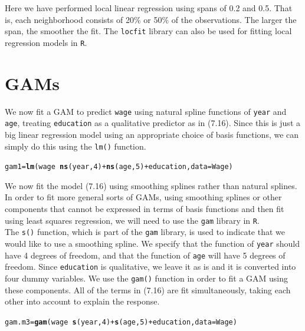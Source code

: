\documentclass[12pt]{article}\usepackage[]{graphicx}\usepackage[]{color}
\makeatletter
\newcommand{\hlnum}[1]{\textcolor[rgb]{0.686,0.059,0.569}{#1}}%
\newcommand{\hlopt}[1]{\textcolor[rgb]{0,0,0}{#1}}%
\newcommand{\hlstd}[1]{\textcolor[rgb]{0.345,0.345,0.345}{#1}}%
\newcommand{\hlkwb}[1]{\textcolor[rgb]{0.69,0.353,0.396}{#1}}%
\newcommand{\hlkwc}[1]{\textcolor[rgb]{0.333,0.667,0.333}{#1}}%
\newcommand{\hlkwd}[1]{\textcolor[rgb]{0.737,0.353,0.396}{\textbf{#1}}}%
\newenvironment{kframe}{%
 \def\at@end@of@kframe{}%
 \ifinner\ifhmode%
  \def\at@end@of@kframe{\end{minipage}}%
  \begin{minipage}{\columnwidth}%
 \fi\fi%
 \def\FrameCommand##1{\hskip\@totalleftmargin \hskip-\fboxsep
 \colorbox{shadecolor}{##1}\hskip-\fboxsep
     \hskip-\linewidth \hskip-\@totalleftmargin \hskip\columnwidth}%
 \MakeFramed {\advance\hsize-\width
   \@totalleftmargin\z@ \linewidth\hsize
   \@setminipage}}%
 {\par\unskip\endMakeFramed%
 \at@end@of@kframe}
\newenvironment{knitrout}{}{} %
\makeatother
\begin{document}
Here we have performed local linear regression using spans of 0.2 and 0.5. That is, each neighborhood consists of 20\% or 50\% of the observations. The larger the span, the smoother the fit. The \texttt{locfit} library can also be used for fitting local regression models in \texttt{R}.

\section{GAMs}

We now fit a GAM to predict \texttt{wage} using natural spline functions of \texttt{year} and \texttt{age}, treating \texttt{education} as a qualitative predictor as in (7.16). Since this is just a big linear regression model using an appropriate choice of basis functions, we can simply do this using the \texttt{lm()} function.

\begin{knitrout}
\color{fgcolor}\begin{kframe}
\begin{alltt}
\hlstd{gam1} \hlkwb{=} \hlkwd{lm}\hlstd{(wage}\hlopt{~}\hlkwd{ns}\hlstd{(year,}\hlnum{4}\hlstd{)} \hlopt{+} \hlkwd{ns}\hlstd{(age,}\hlnum{5}\hlstd{)} \hlopt{+} \hlstd{education,} \hlkwc{data} \hlstd{= Wage)}
\end{alltt}
\end{kframe}
\end{knitrout}

We now fit the model (7.16) using smoothing splines rather than natural splines. In order to fit more general sorts of GAMs, using smoothing splines or other components that cannot be expressed in terms of basis functions and then fit using least squares regression, we will need to use the \texttt{gam} library in \texttt{R}.\\

The \texttt{s()} function, which is part of the \texttt{gam} library, is used to indicate that we would like to use a smoothing spline. We specify that the function of \texttt{year} should have 4 degrees of freedom, and that the function of \texttt{age} will have 5 degrees of freedom. Since \texttt{education} is qualitative, we leave it as is and it is converted into four dummy variables. We use the \texttt{gam()} function in order to fit a GAM using these components. All of the terms in (7.16) are fit simultaneously, taking each other into account to explain the response.

\begin{knitrout}
\color{fgcolor}\begin{kframe}
\begin{alltt}
\hlstd{gam.m3} \hlkwb{=} \hlkwd{gam}\hlstd{(wage}\hlopt{~}\hlkwd{s}\hlstd{(year,}\hlnum{4}\hlstd{)} \hlopt{+} \hlkwd{s}\hlstd{(age,}\hlnum{5}\hlstd{)} \hlopt{+} \hlstd{education,} \hlkwc{data}\hlstd{=Wage)}
\end{alltt}
\end{kframe}
\end{knitrout}
\end{document}

